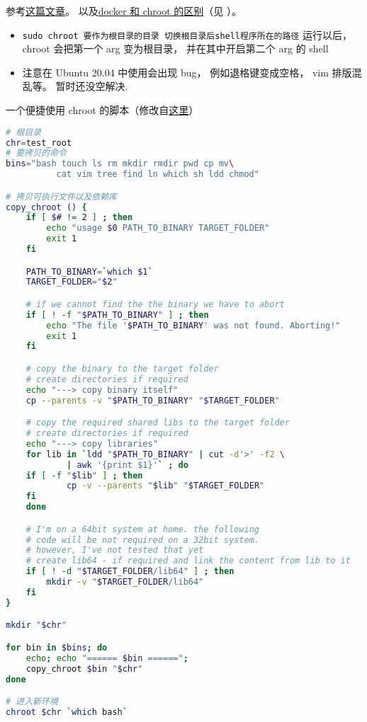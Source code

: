 
\begin{issues}
\issueDraft
\end{issues}

参考\href{https://www.howtogeek.com/441534/how-to-use-the-chroot-command-on-linux/}{这篇文章}。
以及\href{https://devops.stackexchange.com/questions/2826/difference-between-chroot-and-docker}{docker 和 chroot 的区别}（见 ）。

\begin{itemize}
\item \verb`sudo chroot 要作为根目录的目录 切换根目录后shell程序所在的路径` 运行以后， chroot 会把第一个 arg 变为根目录， 并在其中开启第二个 arg 的 shell
\item 注意在 Ubuntu 20.04 中使用会出现 bug， 例如退格键变成空格， vim 排版混乱等。 暂时还没空解决.
\end{itemize}

一个便捷使用 chroot 的脚本（修改自\href{https://gist.github.com/xmonader/5d1fc6134f1f65acd0d10f71453adb27}{这里}）

\begin{lstlisting}[language=bash]
# 根目录
chr=test_root
# 要拷贝的命令
bins="bash touch ls rm mkdir rmdir pwd cp mv\
          cat vim tree find ln which sh ldd chmod"

# 拷贝可执行文件以及依赖库
copy_chroot () {
	if [ $# != 2 ] ; then
		echo "usage $0 PATH_TO_BINARY TARGET_FOLDER"
		exit 1
	fi

	PATH_TO_BINARY=`which $1`
	TARGET_FOLDER="$2"

	# if we cannot find the the binary we have to abort
	if [ ! -f "$PATH_TO_BINARY" ] ; then
		echo "The file '$PATH_TO_BINARY' was not found. Aborting!"
		exit 1
	fi

	# copy the binary to the target folder
	# create directories if required
	echo "---> copy binary itself"
	cp --parents -v "$PATH_TO_BINARY" "$TARGET_FOLDER"

	# copy the required shared libs to the target folder
	# create directories if required
	echo "---> copy libraries"
	for lib in `ldd "$PATH_TO_BINARY" | cut -d'>' -f2 \
            | awk '{print $1}'` ; do
	if [ -f "$lib" ] ; then
			cp -v --parents "$lib" "$TARGET_FOLDER"
	fi  
	done

	# I'm on a 64bit system at home. the following
    # code will be not required on a 32bit system.
	# however, I've not tested that yet
	# create lib64 - if required and link the content from lib to it
	if [ ! -d "$TARGET_FOLDER/lib64" ] ; then
		mkdir -v "$TARGET_FOLDER/lib64"
	fi
}

mkdir "$chr"

for bin in $bins; do
	echo; echo "====== $bin ======";
	copy_chroot $bin "$chr"
done

# 进入新环境
chroot $chr `which bash`
\end{lstlisting}
